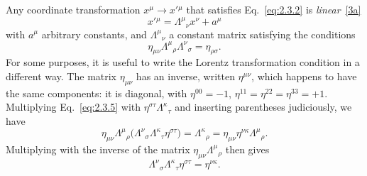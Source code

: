 Any coordinate transformation $x^\mu\to x'{}^\mu$ that satisfies
Eq.~\eqref{eq:2.3.2} is \emph{linear}~\hyperref[ref:2.3a]{[3a]}
\begin{equation}
  x'{}^\mu=\Lambda^\mu{}_{\nu}x^\nu+a^\mu
  \tag{2.3.4}\label{eq:2.3.4}
\end{equation}
with $a^\mu$ arbitrary constants, and $\Lambda^\mu{}_{\nu}$ a constant
matrix satisfying the conditions
\begin{equation}
  \eta_{\mu\nu}\Lambda^\mu{}_{\rho}\Lambda^\nu{}_{\sigma}
    =\eta_{\rho\sigma}.
  \tag{2.3.5}\label{eq:2.3.5}
\end{equation}
For some purposes, it is useful to write the Lorentz transformation
condition in a different way. The matrix $\eta_{\mu\nu}$ has an inverse,
written $\eta^{\mu\nu}$, which happens to have the same components: it is
diagonal, with $\eta^{00}=-1$,
$\eta^{11}=\eta^{22}=\eta^{33}=+1$. Multiplying Eq.~\eqref{eq:2.3.5} with
$\eta^{\sigma\tau}\Lambda^\kappa{}_{\tau}$ and inserting parentheses
judiciously, we have
\begin{equation*}
  \eta_{\mu\nu}\Lambda^\mu{}_{\rho}
  \bigl(\Lambda^\nu{}_{\sigma}\Lambda^\kappa{}_{\tau}
    \eta^{\sigma\tau}\bigr)
  =\Lambda^\kappa{}_{\rho}
  =\eta_{\mu\nu}\eta^{\nu\kappa}\Lambda^\mu{}_{\rho}.
\end{equation*}
Multiplying with the inverse of the matrix
$\eta_{\mu\nu}\Lambda^\mu{}_{\rho}$ then gives
\begin{equation}
  \Lambda^\nu{}_{\sigma}\Lambda^\kappa{}_{\tau}
    \eta^{\sigma\tau}=\eta^{\nu\kappa}.
  \tag{2.3.6}\label{eq:2.3.6}
\end{equation}

